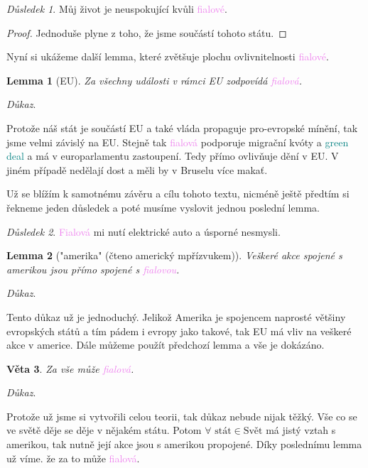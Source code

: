 \documentclass[12pt, a4paper]{article}
\theoremstyle{plain}
\newtheorem{veta}{Věta}
\newtheorem{lemma}[veta]{Lemma}
\theoremstyle{plain}
\theoremstyle{remark}
\newtheorem*{dusl}{Důsledek}
\newenvironment{dukaz}{
	\par\medskip\noindent
	\textit{Důkaz}.
}{
	\newline
	\rightline{$\qedsymbol$}
}
\newcommand{\fialova}[1]{\textcolor{violet}{fialov#1}}
\begin{document}
	\begin{dusl}
		Můj život je neuspokující kvůli \fialova{é}.
	\end{dusl}
	
	\begin{proof}
		Jednoduše plyne z toho, že jsme součástí tohoto státu.
	\end{proof}
	
	Nyní si ukážeme další lemma, které zvětšuje plochu ovlivnitelnosti \fialova{é}.
	
	\begin{lemma}[EU]
		Za všechny události v rámci EU zodpovídá \fialova{á}.
	\end{lemma}
	
	\begin{dukaz}
		Protože náš stát je součástí EU a také vláda propaguje pro-evropské mínění, tak jsme velmi závislý na EU. Stejně tak \fialova{á} podporuje migrační kvóty a \textcolor{teal}{green deal} a má v europarlamentu zastoupení. Tedy přímo ovlivňuje dění v EU. V jiném případě nedělají dost a měli by v Bruselu více makať.
	\end{dukaz}
	
	Už se blížím k samotnému závěru a cílu tohoto textu, nicméně ještě předtím si řekneme jeden důsledek a poté musíme vyslovit jednou poslední lemma.
	
	\begin{dusl}
		\textcolor{violet}{Fialová} mi nutí elektrické auto a úsporné nesmysli.
	\end{dusl}
	
	\begin{lemma}["amerika" (čteno americký mpřízvukem)]
		Veškeré akce spojené s amerikou jsou přímo spojené s \fialova{ou}.
	\end{lemma}
	
	\begin{dukaz}
		Tento důkaz už je jednoduchý. Jelikož Amerika je spojencem naprosté většiny evropských států a tím pádem i evropy jako takové, tak EU má vliv na veškeré akce v americe. Dále můžeme použít předchozí lemma a vše je dokázáno.
	\end{dukaz}
	
	\begin{veta}
		Za vše může \fialova{á}.
	\end{veta}
	
	\begin{dukaz}
		Protože už jsme si vytvořili celou teorii, tak důkaz nebude nijak těžký. Vše co se ve světě děje se děje v nějakém státu. Potom $\forall \text{ stát} \in \text{Svět}$ má jistý vztah s amerikou, tak nutně její akce jsou s amerikou propojené. Díky poslednímu lemma už víme. že za to může \fialova{á}.
	\end{dukaz}
	
\end{document}
